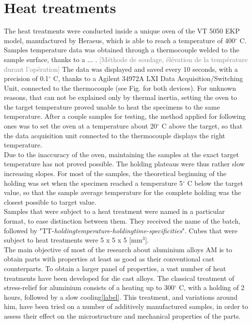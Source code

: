 \section{Heat treatments}
\label{MMHT}
The heat treatments were conducted inside a unique oven of the VT 5050 EKP model, manufactured by Heraeus, which is able to reach a temperature of 400$^\circ$ C. Samples temperature data was obtained through a thermocouple welded to the sample surface, thanks to a ... . \textcolor{gray}{[Méthode de soudage, élévation de la température durant l'opération]} The data was displayed and saved every 10 seconds, with a precision of 0.1$^\circ$ C, thanks to a Agilent 34972A LXI Data Acquisition/Switching Unit, connected to the thermocouple (see Fig. for both devices). For unknown reasons, that can not be explained only by thermal inertia, setting the oven to the target temperature proved unable to heat the specimens to the same temperature. After a couple samples for testing, the method applied for following ones was to set the oven at a temperature about 20$^\circ$ C above the target, so that the data acquisition unit connected to the thermocouple displays the right temperature.\\

Due to the inaccuracy of the oven, maintaining the samples at the exact target temperature has not proved possible. The holding plateaus were thus rather slow increasing slopes. For most of the samples, the theoretical beginning of the holding was set when the specimen reached a temperature 5$^\circ$ C below the target value, so that the sample average temperature for the complete holding was the closest possible to target value.\\

Samples that were subject to a heat treatment were named in a particular format, to ease distinction between them. They received the name of the batch, followed by "TT-\textit{holdingtemperature-holdingtime-specificities}". Cubes that were subject to heat treatments were 5 x 5 x 5 [mm$^3$].\\


The main objective of most of the research about aluminium alloys AM is to obtain parts with properties at least as good as their conventional cast counterparts. To obtain a larger panel of properties, a vast number of heat treatments have been developed for die cast alloys. The classical treatment of stress-relief for aluminium consists of a heating up to 300$^\circ$ C, with a holding of 2 hours, followed by a slow cooling\ref{label}. This treatment, and variations around him, have been tried on a number of additively manufactured samples, in order to assess their effect on the microstructure and mechanical properties of the parts.\\

